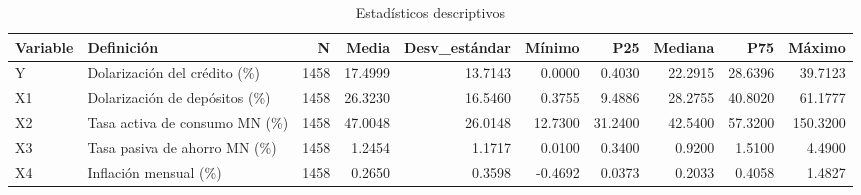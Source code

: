 \begin{table}
\caption{Estadísticos descriptivos}
\label{tab:estadisticos_descriptivos}
\begin{tabular}{llrrrrrrrr}
\toprule
Variable & Definición & N & Media & Desv\_estándar & Mínimo & P25 & Mediana & P75 & Máximo \\
\midrule
Y & Dolarización del crédito (\%) & 1458 & 17.4999 & 13.7143 & 0.0000 & 0.4030 & 22.2915 & 28.6396 & 39.7123 \\
X1 & Dolarización de depósitos (\%) & 1458 & 26.3230 & 16.5460 & 0.3755 & 9.4886 & 28.2755 & 40.8020 & 61.1777 \\
X2 & Tasa activa de consumo MN (\%) & 1458 & 47.0048 & 26.0148 & 12.7300 & 31.2400 & 42.5400 & 57.3200 & 150.3200 \\
X3 & Tasa pasiva de ahorro MN (\%) & 1458 & 1.2454 & 1.1717 & 0.0100 & 0.3400 & 0.9200 & 1.5100 & 4.4900 \\
X4 & Inflación mensual (\%) & 1458 & 0.2650 & 0.3598 & -0.4692 & 0.0373 & 0.2033 & 0.4058 & 1.4827 \\
\bottomrule
\end{tabular}
\end{table}
